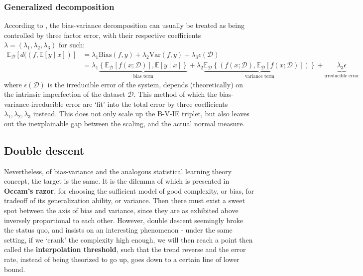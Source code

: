 \documentclass[10pt]{article} %
\begin{document}
\subsubsection{Generalized decomposition}

According to \cite{domingos_unified_aaai_2000,domingos_unified_2000}, the bias-variance decomposition can usually be treated as being controlled by three factor error, with their respective coefficients $\lambda=(\lambda_{1},\lambda_{2},\lambda_{3})$ for such: 
    \noindent 
    \begin{equation*}
        \begin{split}
            \mathbb{E}_{\mathcal{D}} \left[d((f,\mathbb{E}[y\mid x])\right] & = \lambda_{1} \mathrm{Bias}(f,y) + \lambda_{2}\mathrm{Var}(f,y)+ \lambda_{3}\epsilon(\mathcal{D})\\ 
            & = \lambda_{1}\underbrace{\left\{ \mathbb{E}_{\mathcal{D}}[f(x;\mathcal{D})] , \mathbb{E}[y\mid x] \right\}}_{\text{bias term}} +\lambda_{2} \underbrace{\mathbb{E}_{\mathcal{D}} \left\{(f(x;\mathcal{D}), \mathbb{E}_{\mathcal{D}}[f(x;\mathcal{D})])\right\}}_{\text{variance term}} +\underbrace{\lambda_{3}\epsilon}_{\text{irreducible error}}
        \end{split}
        \end{equation*}
where $\epsilon(\mathcal{D})$ is the irreducible error of the system, depends (theoretically) on the intrinsic imperfection of the dataset $\mathcal{D}$. This method of which the bias-variance-irreducible error are `fit' into the total error by three coefficients $\lambda_{1},\lambda_{2},\lambda_{3}$ instead. This does not only scale up the B-V-IE triplet, but also leaves out the inexplainable gap between the scaling, and the actual normal measure. 

\subsection{Double descent}

Nevertheless, of bias-variance and the analogous statistical learning theory concept, the target is the same. It is the dilemma of which is presented in \textbf{Occam's razor}, for choosing the sufficient model of good complexity, or bias, for tradeoff of its generalization ability, or variance. Then there must exist a sweet spot between the axis of bias and variance, since they are as exhibited above inversely proportional to each other. However, double descent seemingly broke the status quo, and insists on an interesting phenomenon - under the same setting, if we `crank' the complexity high enough, we will then reach a point then called the \textbf{interpolation threshold}, such that the trend reverse and the error rate, instead of being theorized to go up, goes down to a certain line of lower bound. 
\end{document}
